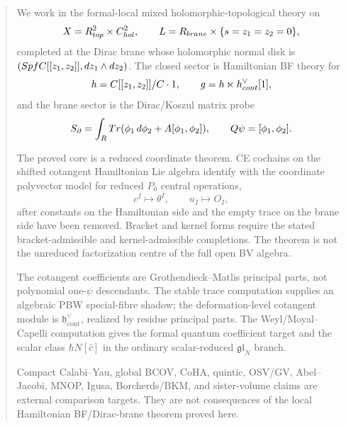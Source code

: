 \begin{abstract}
We work in the formal-local mixed holomorphic-topological theory on
\[
  X=\R^2_{\mathrm{top}}\times\C^2_{\mathrm{hol}},
  \qquad
  L=\R_{\mathrm{brane}}\times\{s=z_1=z_2=0\},
\]
completed at the Dirac brane whose holomorphic normal disk is
\((\operatorname{Spf}\C[[z_1,z_2]],dz_1\wedge dz_2)\).  The closed
sector is Hamiltonian BF theory for
\[
  \mathfrak h=\C[[z_1,z_2]]/\C\cdot1,\qquad
  \mathfrak g=\mathfrak h\ltimes
  \mathfrak h^\vee_{\mathrm{cont}}[1],
\]
and the brane sector is the Dirac/Koszul matrix probe
\[
  S_\partial=\int_\R
  \operatorname{Tr}(\phi_1\,d\phi_2+A[\phi_1,\phi_2]),
  \qquad Q\psi=[\phi_1,\phi_2].
\]

The proved core is a reduced coordinate theorem.  CE cochains on the
shifted cotangent Hamiltonian Lie algebra identify with the coordinate
polyvector model for reduced \(P_0\) central operations,
\[
  c^I\mapsto \theta^I,\qquad u_I\mapsto O_I,
\]
after constants on the Hamiltonian side and the empty trace on the brane
side have been removed.  Bracket and kernel forms require the stated
bracket-admissible and kernel-admissible completions.  The theorem is not
the unreduced factorization centre of the full open BV algebra.

The cotangent coefficients are Grothendieck--Matlis principal parts,
not polynomial one-\(\psi\) descendants.  The stable trace computation
supplies an algebraic PBW special-fibre shadow; the deformation-level
cotangent module is
\(\mathfrak h^\vee_{\mathrm{cont}}\), realized by residue principal
parts.  The Weyl/Moyal--Capelli computation gives the formal quantum
coefficient target and the scalar class \(\hbar N[\bar c]\) in the
ordinary scalar-reduced \(\mathfrak{gl}_N\) branch.

Compact Calabi--Yau, global BCOV, CoHA, quintic, OSV/GV,
Abel--Jacobi, MNOP, Igusa, Borcherds/BKM, and sister-volume claims are
external comparison targets.  They are not consequences of the local
Hamiltonian BF/Dirac-brane theorem proved here.
\end{abstract}
